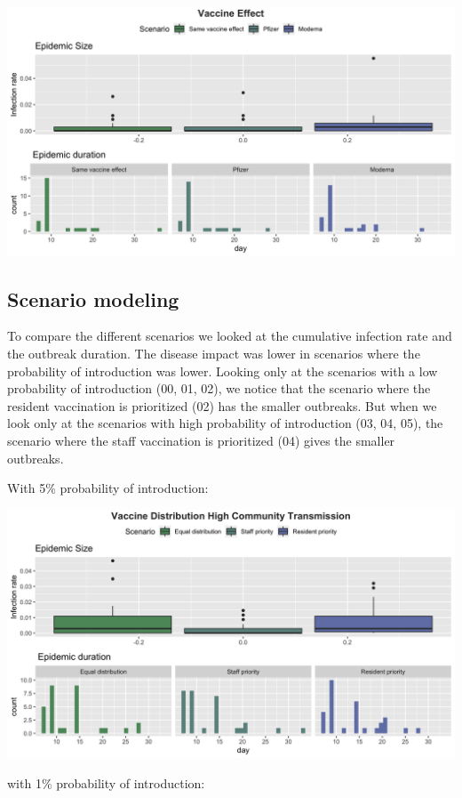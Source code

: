 \documentclass[
]{article}
\begin{document}
\includegraphics{Figures/Scenarios/Vaccination}

\hypertarget{scenario-modeling-1}{%
\subsection{Scenario modeling}\label{scenario-modeling-1}}

To compare the different scenarios we looked at the cumulative infection
rate and the outbreak duration. The disease impact was lower in
scenarios where the probability of introduction was lower. Looking only
at the scenarios with a low probability of introduction (00, 01, 02), we
notice that the scenario where the resident vaccination is prioritized
(02) has the smaller outbreaks. But when we look only at the scenarios
with high probability of introduction (03, 04, 05), the scenario where
the staff vaccination is prioritized (04) gives the smaller outbreaks.

With 5\% probability of introduction:

\includegraphics{Figures/Scenarios/VD_High}

with 1\% probability of introduction:
\end{document}

